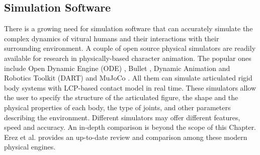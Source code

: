 \subsection{Simulation Software}

There is a growing need for simulation software that can accurately simulate the complex dynamics of vitural humans and their interactions with their surrounding environment. A couple of open source physical simulators are readily available for research in physically-based character animation. The popular ones include Open Dynamic Engine (ODE) \cite{ode:2008}, Bullet \cite{bullet}, Dynamic Animation and Robotics Toolkit (DART) \cite{dart:2012} and MuJoCo \cite{mujoco}. All them can simulate articulated rigid body systems with LCP-based contact model in real time. These simulators allow the user to specify the structure of the articulated figure, the shape and the physical properties of each body, the type of joints, and other parameters describing the environment. Different simulators may offer different features, speed and accuracy. An in-depth comparison is beyond the scope of this Chapter. Erez et al.\cite{ErezTT15} provides an up-to-date review and comparison among these modern physical engines.
